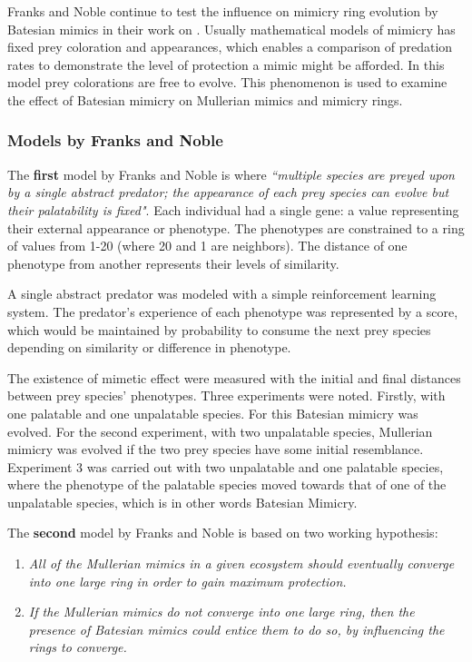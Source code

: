 \documentclass[letterpaper]{article}
\numberwithin{equation}{section}
\begin{document}
Franks and Noble continue to test the influence on mimicry ring evolution by Batesian mimics in their work on \cite{franks2004}. Usually mathematical models of mimicry has fixed prey coloration and appearances, which enables a comparison of predation rates to demonstrate the level of protection a mimic might be afforded. In this model prey colorations are free to evolve. This phenomenon is used to examine the effect of Batesian mimicry on Mullerian mimics and mimicry rings. 

\subsubsection{Models by Franks and Noble}
\label{subsubsec:models-by-frank-and-noble}
The \textbf{first} model by Franks and Noble \cite{franks2002} is where \textsl{``multiple species are preyed upon by a single abstract predator; the appearance of each prey species can evolve but their palatability is fixed"}. Each individual had a single gene: a value representing their external appearance or phenotype. The phenotypes are constrained to a ring of values from 1-20 (where 20 and 1 are neighbors). The distance of one phenotype from another represents their levels of similarity. 

A single abstract predator was modeled with a simple reinforcement learning system. The predator's experience of each phenotype was represented by a score, which would be maintained by probability to consume the next prey species depending on similarity or difference in phenotype. 

The existence of mimetic effect were measured with the initial and final distances between prey species' phenotypes. Three experiments were noted. Firstly, with one palatable and one unpalatable species. For this Batesian mimicry was evolved. For the second experiment, with two unpalatable species, Mullerian mimicry was evolved if the two prey species have some initial resemblance. Experiment 3 was carried out with two unpalatable and one palatable species, where the phenotype of the palatable species moved towards that of one of the unpalatable species, which is in other words Batesian Mimicry.

The \textbf{second} model by Franks and Noble \cite{franks2003} is based on two working hypothesis:

\begin{enumerate}
	\item \textsl{All of the Mullerian mimics in a given ecosystem should eventually converge into one large ring in order to gain maximum protection.}
	\item \textsl{If the Mullerian mimics do not converge into one large ring, then the presence of Batesian mimics could entice them to do so, by influencing the rings to converge.}
\end{enumerate}
\end{document}
